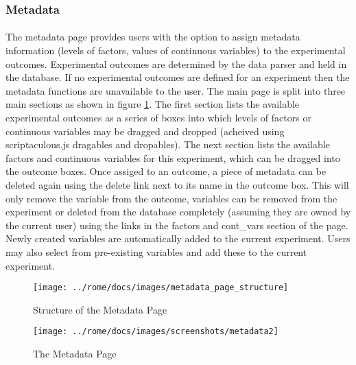 \subsubsection{Metadata}
\label{sec:view_metadata}

\paragraph{}
The metadata page provides users with the option to assign metadata information (levels of factors, values of continuous variables) to the experimental outcomes. Experimental outcomes are determined by the data parser and held in the database. If no experimental outcomes are defined for an experiment then the metadata functions are unavailable to the user. The main page is split into three main sections as shown in figure \ref{fig:metadata_page_structure}. The first section lists the available experimental outcomes as a series of boxes into which levels of factors or continuous variables may be dragged and dropped (acheived using scriptaculous.js dragables and dropables). The next section lists the available factors and continuous variables for this experiment, which can be dragged into the outcome boxes. Once assiged to an outcome, a piece of metadata can be deleted again using the delete link next to its name in the outcome box. This will only remove the variable from the outcome, variables can be removed from the experiment or deleted from the database completely (assuming they are owned by the current user) using the links in the factors and cont\_vars section of the page. Newly created variables are automatically added to the current experiment. Users may also select from pre-existing variables and add these to the current experiment.


\begin{figure}[h]
\centering
\texttt{[image: ../rome/docs/images/metadata\_page\_structure]}
\caption{Structure of the Metadata Page}\label{fig:metadata_page_structure}
\end{figure}



\begin{figure}[h]
\centering
\texttt{[image: ../rome/docs/images/screenshots/metadata2]}
\caption{The Metadata Page}\label{fig:metadata_view}
\end{figure}

\clearpage